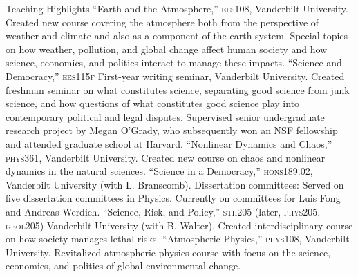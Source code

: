 \begin{rubric}{Teaching Highlights}
\entry*[2004--]``Earth and the Atmosphere,'' \textsc{ees108}, Vanderbilt University. Created new course covering the atmosphere both from the perspective of weather and climate and also as a component of the earth system. Special topics on how weather, pollution, and global change affect human society and how science, economics, and politics interact to manage these impacts. 
\entry*[2004--]``Science and Democracy,'' \textsc{ees115f} First-year writing seminar, Vanderbilt University. Created freshman seminar on what constitutes science, separating good science from junk science, and how questions of what constitutes good science play into contemporary political and legal disputes.
\entry*[2002--2003]Supervised senior undergraduate research project by Megan O'Grady, who subsequently won an NSF fellowship and attended graduate school at Harvard.
\entry*[2000--2003]``Nonlinear Dynamics and Chaos,'' \textsc{phys361}, Vanderbilt University. Created new course on chaos and nonlinear dynamics in the natural sciences.
\entry*[2000]``Science in a Democracy,'' \textsc{hons189.02}, Vanderbilt University (with L. Branscomb).
\entry*[1997--2003]Dissertation committees: Served on five dissertation committees in Physics. Currently on committees for Luis Fong and Andreas Werdich.
\entry*[1996--]``Science, Risk, and Policy,'' \textsc{sth205} (later, \textsc{phys205}, \textsc{geol205}) Vanderbilt University (with B. Walter). Created interdisciplinary course on how society manages lethal risks.
\entry*[1995--1998]``Atmospheric Physics,'' \textsc{phys108}, Vanderbilt University. Revitalized atmospheric physics course with focus on the science, economics, and politics of global environmental change.
\end{rubric}
